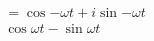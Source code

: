 \documentclass[preview]{standalone}
\begin{document}
\begin{align*}
=\cos{-\omega t}+i\sin{-\omega t} \\ \cos{\omega t}-\sin{\omega t}
\end{align*}
\end{document}
